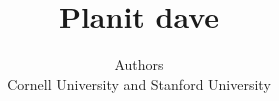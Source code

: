 \documentclass[letterpaper, 10 pt, conference]{ieeeconf}  %
\begin{document}
\title{Planit dave}

\author{Authors\\
Cornell University and Stanford University\\}


\maketitle
\maketitle

\IEEEpeerreviewmaketitle




















{


}
\end{document}
